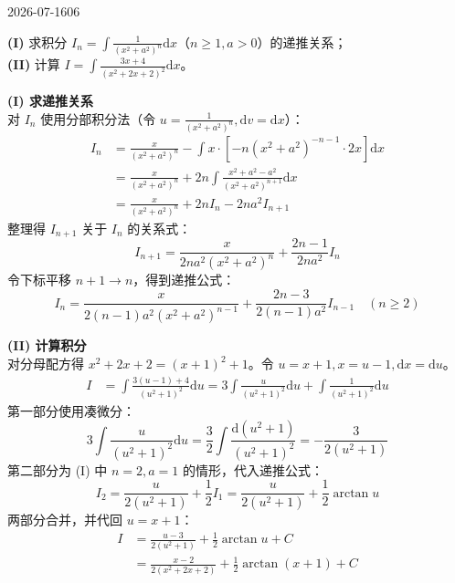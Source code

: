 \begin{mistake}{2026-07-16}{06}

\begin{problemcontent}
\textbf{(I)} 求积分 \( I_n = \int \frac{1}{(x^2+a^2)^n} \mathrm{d}x \)（\(n \ge 1, a > 0\)）的递推关系；\\
\textbf{(II)} 计算 \( I = \int \frac{3x+4}{(x^2+2x+2)^2} \mathrm{d}x \)。
\end{problemcontent}

\begin{solutioncontent}
\textbf{(I) 求递推关系}\\
对 \(I_n\) 使用分部积分法（令 \(u = \frac{1}{(x^2+a^2)^n}, \mathrm{d}v = \mathrm{d}x\)）：
\[
\begin{aligned}
I_n &= \frac{x}{(x^2+a^2)^n} - \int x \cdot \left[ -n(x^2+a^2)^{-n-1} \cdot 2x \right] \mathrm{d}x \\
&= \frac{x}{(x^2+a^2)^n} + 2n \int \frac{x^2+a^2-a^2}{(x^2+a^2)^{n+1}} \mathrm{d}x \\
&= \frac{x}{(x^2+a^2)^n} + 2n I_n - 2n a^2 I_{n+1}
\end{aligned}
\]
整理得 \(I_{n+1}\) 关于 \(I_n\) 的关系式：
\[
I_{n+1} = \frac{x}{2na^2(x^2+a^2)^n} + \frac{2n-1}{2na^2} I_n
\]
令下标平移 \(n+1 \to n\)，得到递推公式：
\[
I_n = \frac{x}{2(n-1)a^2(x^2+a^2)^{n-1}} + \frac{2n-3}{2(n-1)a^2} I_{n-1} \quad (n \ge 2)
\]

\textbf{(II) 计算积分}\\
对分母配方得 \(x^2+2x+2 = (x+1)^2+1\)。令 \(u = x+1, x = u-1, \mathrm{d}x = \mathrm{d}u\)。
\[
\begin{aligned}
I &= \int \frac{3(u-1)+4}{(u^2+1)^2} \mathrm{d}u = 3 \int \frac{u}{(u^2+1)^2} \mathrm{d}u + \int \frac{1}{(u^2+1)^2} \mathrm{d}u
\end{aligned}
\]
第一部分使用凑微分：
\[
3 \int \frac{u}{(u^2+1)^2} \mathrm{d}u = \frac{3}{2} \int \frac{\mathrm{d}(u^2+1)}{(u^2+1)^2} = -\frac{3}{2(u^2+1)}
\]
第二部分为 (I) 中 \(n=2, a=1\) 的情形，代入递推公式：
\[
I_2 = \frac{u}{2(u^2+1)} + \frac{1}{2} I_1 = \frac{u}{2(u^2+1)} + \frac{1}{2} \arctan u
\]
两部分合并，并代回 \(u=x+1\)：
\[
\begin{aligned}
I &= \frac{u-3}{2(u^2+1)} + \frac{1}{2} \arctan u + C \\
&= \frac{x-2}{2(x^2+2x+2)} + \frac{1}{2} \arctan(x+1) + C
\end{aligned}
\]
\end{solutioncontent}


\end{mistake}
